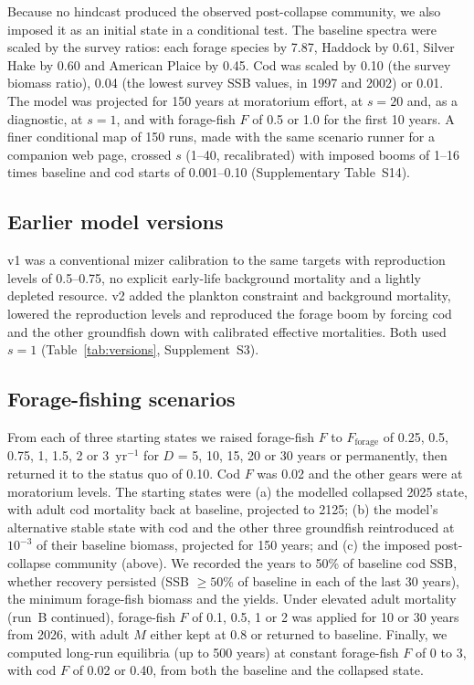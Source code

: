 \documentclass[12pt,letterpaper,fleqn]{article}
\newcommand{\yr}{yr$^{-1}$}
\begin{document}
Because no hindcast produced the observed post-collapse community, we also imposed it as an initial state in a conditional test. The baseline spectra were scaled by the survey ratios: each forage species by 7.87, Haddock by 0.61, Silver Hake by 0.60 and American Plaice by 0.45. Cod was scaled by 0.10 (the survey biomass ratio), 0.04 (the lowest survey SSB values, in 1997 and 2002) or 0.01. The model was projected for 150 years at moratorium effort, at $s=20$ and, as a diagnostic, at $s=1$, and with forage-fish $F$ of 0.5 or 1.0 for the first 10 years. A finer conditional map of 150 runs, made with the same scenario runner for a companion web page, crossed $s$ (1--40, recalibrated) with imposed booms of 1--16 times baseline and cod starts of 0.001--0.10 (Supplementary Table~S14).

\subsection{Earlier model versions}\label{sec:versions}

v1 was a conventional mizer calibration to the same targets with reproduction levels of 0.5--0.75, no explicit early-life background mortality and a lightly depleted resource. v2 added the plankton constraint and background mortality, lowered the reproduction levels and reproduced the forage boom by forcing cod and the other groundfish down with calibrated effective mortalities. Both used $s=1$ (Table~\ref{tab:versions}, Supplement~S3).

\subsection{Forage-fishing scenarios}\label{sec:forage}

From each of three starting states we raised forage-fish $F$ to $F_{\mathrm{forage}}$ of 0.25, 0.5, 0.75, 1, 1.5, 2 or 3~\yr{} for $D$ = 5, 10, 15, 20 or 30 years or permanently, then returned it to the status quo of 0.10. Cod $F$ was 0.02 and the other gears were at moratorium levels. The starting states were (a) the modelled collapsed 2025 state, with adult cod mortality back at baseline, projected to 2125; (b) the model's alternative stable state with cod and the other three groundfish reintroduced at $10^{-3}$ of their baseline biomass, projected for 150 years; and (c) the imposed post-collapse community (above). We recorded the years to 50\% of baseline cod SSB, whether recovery persisted (SSB $\geq50$\% of baseline in each of the last 30 years), the minimum forage-fish biomass and the yields. Under elevated adult mortality (run~B continued), forage-fish $F$ of 0.1, 0.5, 1 or 2 was applied for 10 or 30 years from 2026, with adult $M$ either kept at 0.8 or returned to baseline. Finally, we computed long-run equilibria (up to 500 years) at constant forage-fish $F$ of 0 to 3, with cod $F$ of 0.02 or 0.40, from both the baseline and the collapsed state.
\end{document}
